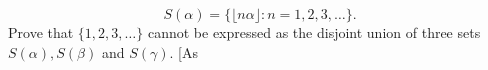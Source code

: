 \[
S(\alpha) = \{ \lfloor n\alpha \rfloor : n = 1,2,3,\dots \}.
\]
Prove that $\{1,2,3,\dots\}$ cannot be expressed as the disjoint
union of three sets $S(\alpha), S(\beta)$ and $S(\gamma)$. [As
